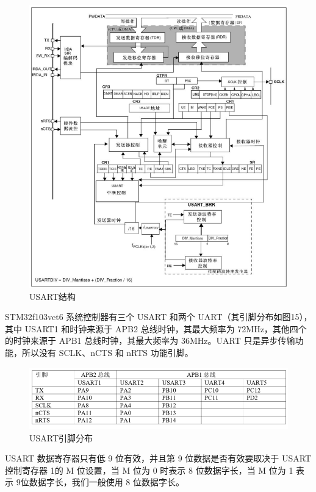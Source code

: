 \documentclass[UTF8,a4paper,11pt]{article}
\begin{document}
\begin{figure}[htbp]
    \centering
    \includegraphics[scale=0.9]{p14.png}
    \caption{USART结构}
\end{figure} 

STM32f103vet6 系统控制器有三个 USART 和两个 UART（其引脚分布如图15），其中 USART1 和时钟来源于 APB2 总线时钟，其最大频率为 72MHz，其他四个的时钟来源于 APB1 总线时钟，其最大频率为 36MHz。UART 只是异步传输功能，所以没有 SCLK、nCTS 和 nRTS 功能引脚。

\begin{figure}[htbp]
    \centering
    \includegraphics[scale=0.7]{p15.png}
    \caption{USART引脚分布}
\end{figure}

USART 数据寄存器只有低 9 位有效，并且第 9 位数据是否有效要取决于 USART控制寄存器 1的 M 位设置，当 M 位为 0 时表示 8 位数据字长，当 M 位为 1 表示 9位数据字长，我们一般使用 8 位数据字长。
\end{document}

